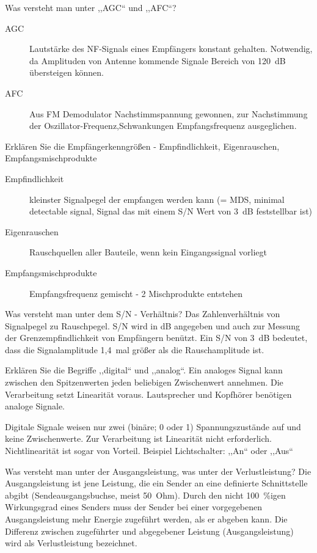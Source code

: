 \documentclass[avery5371,grid,frame,a4paper]{flashcards}
\newcommand{\card}[3]{
  \begin{flashcard}[{\chap} -- #1]{#2}#3\end{flashcard}
}
\begin{document}
\card{24}{Was versteht man unter ,,AGC`` und ,,AFC``?}{
  \begin{description}
    \item[AGC] Lautstärke des NF-Signals eines Empfängers konstant gehalten. Notwendig, da Amplituden von Antenne kommende Signale Bereich von \SI{120}{\dB} übersteigen können.
    \item[AFC] Aus FM Demodulator Nachstimmspannung gewonnen, zur Nachstimmung der Oszillator-Frequenz,Schwankungen Empfangsfrequenz ausgeglichen.
  \end{description}
}
\card{25}{Erklären Sie die Empfängerkenngrößen - Empfindlichkeit, Eigenrauschen, Empfangsmischprodukte}{
  \begin{description}
    \item[Empfindlichkeit] kleinster Signalpegel der empfangen werden kann (= MDS, minimal detectable signal, Signal das mit einem S/N Wert von \SI{3}{\dB} feststellbar ist)
    \item[Eigenrauschen] Rauschquellen aller Bauteile, wenn kein Eingangssignal vorliegt
    \item[Empfangsmischprodukte] Empfangsfrequenz gemischt - 2 Mischprodukte entstehen
  \end{description}
}
\card{26}{Was versteht man unter dem S/N - Verhältnis?}{
  Das Zahlenverhältnis von Signalpegel zu Rauschpegel. S/N wird in dB angegeben und auch zur Messung der Grenzempfindlichkeit von Empfängern benützt.
  Ein S/N von 3~dB bedeutet, dass die Signalamplitude 1,4~mal größer als die Rauschamplitude ist.
}
\card{27}{Erklären Sie die Begriffe ,,digital`` und ,,analog``.}{
  Ein analoges Signal kann zwischen den Spitzenwerten jeden beliebigen Zwischenwert annehmen. Die Verarbeitung setzt Linearität voraus. Lautsprecher und Kopfhörer benötigen analoge Signale.

  Digitale Signale weisen nur zwei (binäre; 0 oder 1) Spannungszustände auf und keine Zwischenwerte. Zur Verarbeitung ist Linearität nicht erforderlich. Nichtlinearität ist sogar von Vorteil. Beispiel Lichtschalter: ,,An`` oder ,,Aus``}
\card{28}{Was versteht man unter der Ausgangsleistung, was unter der Verlustleistung?}{
  Die Ausgangsleistung ist jene Leistung, die ein Sender an eine definierte Schnittstelle abgibt (Sendeausgangsbuchse, meist 50~Ohm). Durch den nicht \SI{100}{\percent}igen Wirkungsgrad eines Senders muss der Sender bei einer vorgegebenen Ausgangsleistung mehr Energie zugeführt werden, als er abgeben kann. Die Differenz zwischen zugeführter und abgegebener Leistung (Ausgangsleistung) wird als Verlustleistung bezeichnet.
}
\end{document}
